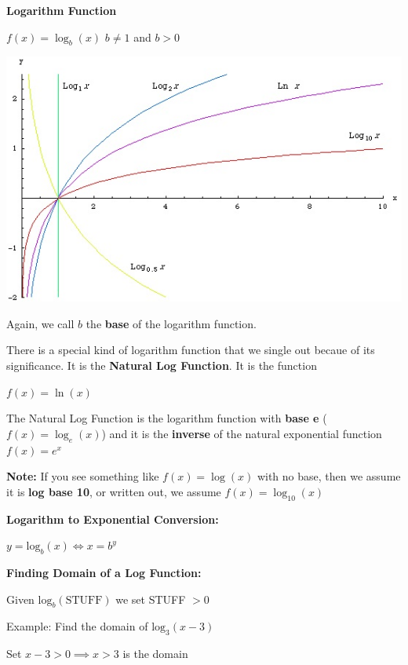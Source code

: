 \documentclass[12pt]{article}
\newenvironment{myindentpar}[1]%
     {\begin{list}{}%
             {\setlength{\leftmargin}{#1}}%
             \item[]%
     }
     {\end{list}}
\begin{document}
\textbf{Logarithm Function}
\newline

\centerline{$f(x) = \log_{b}(x)$ \hspace{2cm} $b \neq 1$ and $b > 0$} 

\vspace{.5cm}

\centerline{\includegraphics{LogGraph.jpg}}

Again, we call $b$ the \textbf{base} of the logarithm function. 

There is a special kind of logarithm function that we single out becaue of its significance. It is the \textbf{Natural Log Function}. It is the function
\newline

\centerline{$f(x) = \ln(x)$}

The Natural Log Function is the logarithm function with \textbf{base e} \Big($f(x) = \log_{e}(x)$\Big) and it is the \textbf{inverse} of the natural exponential function $f(x) = e^{x}$

\textbf{Note:} If you see something like $f(x) = \log(x)$ with no base, then we assume it is \textbf{log base 10}, or written out, we assume $f(x) = \log_{10}(x)$

\textbf{Logarithm to Exponential Conversion:}
\newline

\centerline{$y = \text{log}_{b}(x) \Leftrightarrow x = b^{y}$}

\textbf{Finding Domain of a Log Function:}
\newline

\centerline{Given $\text{log}_{b}(\text{STUFF})$ we set STUFF $> 0$}


\begin{myindentpar}{1cm}
\textbf{Example:} Find the domain of $\text{log}_{3}(x-3)$

\begin{myindentpar}{2cm}
- Set $x - 3 > 0 \implies x > 3$ is the domain
\end{myindentpar}
\end{myindentpar}
\end{document}
